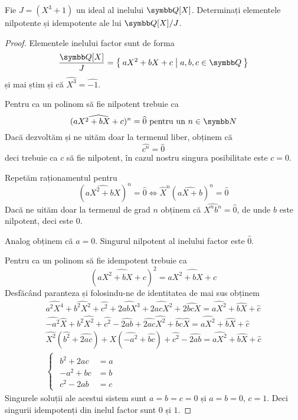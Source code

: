 \begin{exercise}
Fie \(J = (X^3 + 1)\) un ideal al inelului \(\rationals[X]\). Determinați elementele nilpotente și idempotente ale lui \(\rationals[X]/J\).
\end{exercise}
\begin{proof}
Elementele inelului factor sunt de forma
\[
    \frac{\rationals[X]}{J} = \Set{ aX^2 + bX + c | a, b, c \in \rationals }
\]
și mai știm și că \(\widehat{X^3} = \widehat{-1}\).

Pentru ca un polinom să fie nilpotent trebuie ca
\[
    (\widehat{aX^2 + bX + c})^n = \widehat{0} \text{ pentru un } n \in \naturals
\]
Dacă dezvoltăm și ne uităm doar la termenul liber, obținem că
\[
    \widehat{c^n} = \widehat{0}
\]
deci trebuie ca \(c\) să fie nilpotent, în cazul nostru singura posibilitate este \(c = 0\).

Repetăm raționamentul pentru
\[
    (\widehat{aX^2 + bX})^n = \widehat{0} \iff \widehat{X}^n(\widehat{aX + b})^n = \widehat{0}
\]
Dacă ne uităm doar la termenul de grad \(n\) obținem că \(\widehat{X^n b^n} = \widehat{0}\), de unde \(b\) este nilpotent, deci este \(0\).

Analog obținem că \(a = 0\). Singurul nilpotent al inelului factor este \(\widehat{0}\).

Pentru ca un polinom să fie idempotent trebuie ca
\[
    (\widehat{aX^2 + bX + c})^2 = \widehat{aX^2 + bX + c}
\]
Desfăcând paranteza și folosindu-ne de identitatea de mai sus obținem
\begin{gather*}
    \widehat{a^2 X^4} + \widehat{b^2 X^2} + \widehat{c^2} + \widehat{2abX^3} + \widehat{2acX^2} + \widehat{2bcX} = \widehat{aX^2} + \widehat{bX} + \widehat{c} \\
    \widehat{- a^2} \widehat{X} + \widehat{b^2} \widehat{X^2} + \widehat{c^2} - \widehat{2ab} + \widehat{2ac} \widehat{X^2} + \widehat{bc} \widehat{X} = \widehat{aX^2} + \widehat{bX} + \widehat{c} \\
    \widehat{X^2}(\widehat{b^2} + \widehat{2ac}) + X(\widehat{- a^2} + \widehat{bc}) + \widehat{c^2} - \widehat{2ab} = \widehat{aX^2} + \widehat{bX} + \widehat{c} \\
    \begin{cases}
    \begin{aligned}
        b^2 + 2ac &= a \\
        -a^2 + bc &= b \\
        c^2 - 2ab &= c
    \end{aligned}
    \end{cases}
\end{gather*}
Singurele soluții ale acestui sistem sunt \(a = b = c = 0\) și \(a = b = 0\), \(c = 1\). Deci singurii idempotenți din inelul factor sunt \(0\) și \(1\).
\end{proof}

